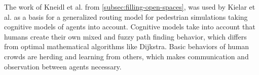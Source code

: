 		The work of Kneidl et al. from \cref{subsec:filling-open-spaces}, was used by Kielar et al. as a basis for a generalized routing model for pedestrian simulations \cite{kielar-unified-pedestrian-routing} taking cognitive models of agents into account.
		Cognitive models take into account that humans create their own mixed and fuzzy path finding behavior, which differs from optimal mathematical algorithms like Dijkstra.
		Basic behaviors of human crowds are herding and learning from others, which makes communication and observation between agents necessary.
		
		